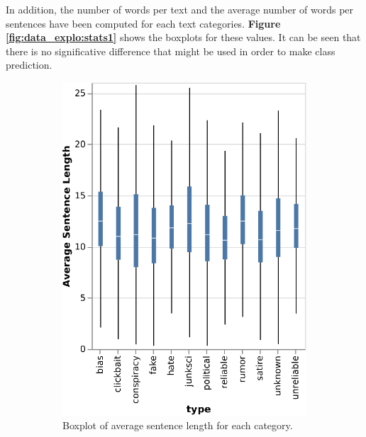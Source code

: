 In addition, the number of words per text and the average number of words per sentences have been computed for each text categories. \textbf{Figure \ref{fig:data_explo:stats1}} shows the boxplots for these values. It can be seen that there is no significative difference that might be used in order to make class prediction. 

\begin{figure}[!ht]
  \centering
  \begin{subfigure}[b]{0.4\textwidth}
    \includegraphics{images/data_exploration/boxplot_avgSentLen.eps}
    \caption{Boxplot of average sentence length for each category.}
  \end{subfigure}
  \hfill
  \begin{subfigure}[b]{0.4\textwidth}

\end{subfigure}
\end{figure}

